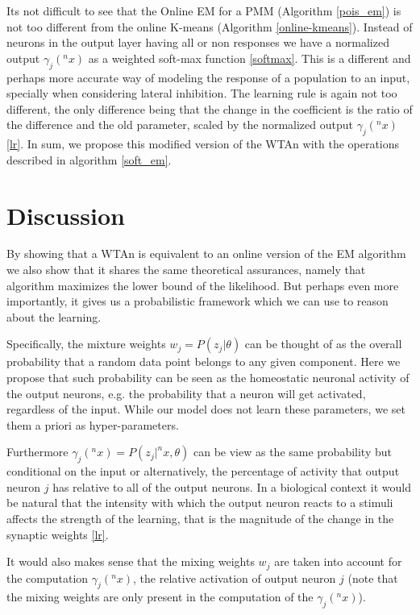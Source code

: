 \documentclass{article}
\begin{document}
Its not difficult to see that the Online EM for a PMM (Algorithm \ref{pois_em}) is not too different from the online K-means (Algorithm \ref{online-kmeans}). Instead of neurons in the output layer having all or non responses we have a normalized output $\gamma_j(^nx)$ as a weighted soft-max function \eqref{softmax}. This is a different and perhaps more accurate way of modeling the response of a population to an input, specially when considering lateral inhibition. The learning rule is again not too different, the only difference being that the change in the coefficient is the ratio of the difference and the old parameter, scaled by the normalized output $\gamma_j(^nx)$ \eqref{lr}. In sum, we propose this modified version of the WTAn with the operations described in algorithm \ref{soft_em}.

\section{Discussion}
By showing that a WTAn is equivalent to an online
version of the EM algorithm we also show that it shares the same
theoretical assurances, namely that algorithm maximizes the lower bound
of the likelihood. But perhaps even more importantly, it gives us a
probabilistic framework which we can use to reason about the learning.

Specifically, the mixture weights \(w_j = P(z_j | \theta)\) can be
thought of as the overall probability that a random data point belongs
to any given component. Here we propose that such probability can be
seen as the homeostatic neuronal activity of the output neurons,
e.g. the probability that a neuron will get activated, regardless of the
input. While our model does not learn these parameters, we set them
a priori as hyper-parameters.

Furthermore \(\gamma_j(^nx) = P (z_j | ^nx, \theta)\) can be view as the
same probability but conditional on the input or alternatively, the
percentage of activity that output neuron \(j\) has relative to all of
the output neurons. In a biological context it would be natural that the
intensity with which the output neuron reacts to a stimuli affects the
strength of the learning, that is the magnitude of the change in the
synaptic weights \eqref{lr}. 

It would also makes sense
that the mixing weights \(w_j\) are taken into account for the
computation \(\gamma_j(^nx)\), the relative activation of output neuron
\(j\) (note that the mixing weights are only present in the computation
of the \(\gamma_j(^nx)\)).
\end{document}
